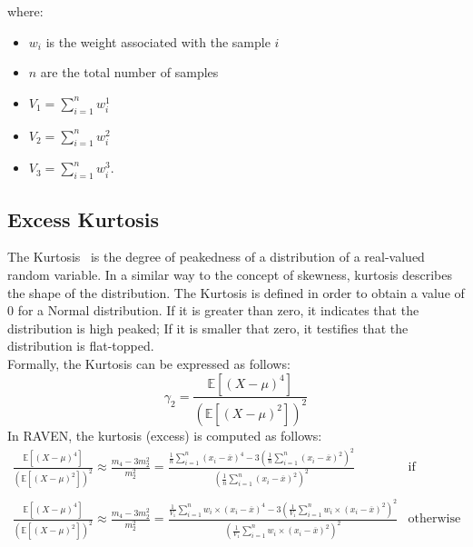 where:
\begin{itemize}
  \item $w_{i}$ is the weight associated with the sample $i$
  \item $n$ are the total number of samples
  \item $V_{1} = \sum_{i=1}^{n} w_{i}^{1}$
  \item $V_{2} = \sum_{i=1}^{n} w_{i}^{2}$
  \item $V_{3} = \sum_{i=1}^{n} w_{i}^{3}$.
\end{itemize}

\subsection{Excess Kurtosis}
The  Kurtosis~\cite{Abramowitz}  is the degree of peakedness of a distribution of a real-valued random variable. In a similar way to the concept of skewness, kurtosis describes the shape of the distribution. The Kurtosis is defined in order to
obtain a value of $0$ for a Normal distribution. If it is greater than zero, it indicates that the distribution is high peaked; If it is smaller
that zero, it testifies that the distribution is flat-topped.
\\Formally, the Kurtosis can be expressed as follows:
\begin{equation}
\gamma_{2} = \frac{ \mathbb{E}\left [ \left ( X-\mu \right )^{4} \right ]}{\left ( \mathbb{E}\left [ \left ( X-\mu \right )^{2} \right ] \right )^{2}}
\end{equation}
In RAVEN, the kurtosis (excess) is computed as follows:
\begin{equation}
\begin{matrix}
\frac{ \mathbb{E}\left [ \left ( X-\mu \right )^{4} \right ]}{\left ( \mathbb{E}\left [ \left ( X-\mu \right )^{2} \right ] \right )^{2}}   \approx \frac{m_{4}-3m_{2}^{2}}{m_{2}^{2}} = \displaystyle  \frac{  \frac{1}{n} \sum_{i=1}^{n}  (x_{i} - \overline{x})^{4} -3\left ( \frac{1}{n} \sum_{i=1}^{n}  (x_{i} - \overline{x})^{2} \right )^{2}}{\left ( \frac{1}{n} \sum_{i=1}^{n}  (x_{i} - \overline{x})^{2} \right )^{2}} & \text{if random sampling}
\\
\\
\frac{ \mathbb{E}\left [ \left ( X-\mu \right )^{4} \right ]}{\left ( \mathbb{E}\left [ \left ( X-\mu \right )^{2} \right ] \right )^{2}}   \approx \frac{m_{4}-3m_{2}^{2}}{m_{2}^{2}} = \displaystyle  \frac{  \frac{1}{V_{1}} \sum_{i=1}^{n} w_{i} \times (x_{i} - \overline{x})^{4} -3\left ( \frac{1}{V_{1}} \sum_{i=1}^{n}  w_{i} \times (x_{i} - \overline{x})^{2} \right )^{2}}{\left ( \frac{1}{V_{1}} \sum_{i=1}^{n}  w_{i} \times (x_{i} - \overline{x})^{2} \right )^{2}} &   \text{otherwise}
\end{matrix}
\end{equation}
